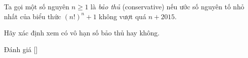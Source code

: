 \ifshowproblem
\begin{problem}\label{problem:ROM-2015-P3}
    Ta gọi một số nguyên \( n \ge 1 \) là \textit{bảo thủ} (conservative)
    nếu ước số nguyên tố nhỏ nhất của biểu thức \( (n!)^n + 1 \) không vượt quá \( n + 2015 \).

    Hãy xác định xem có vô hạn số bảo thủ hay không.
\end{problem}
\fi

\ifshowinfo
Đánh giá [\textbf{}]
\fi